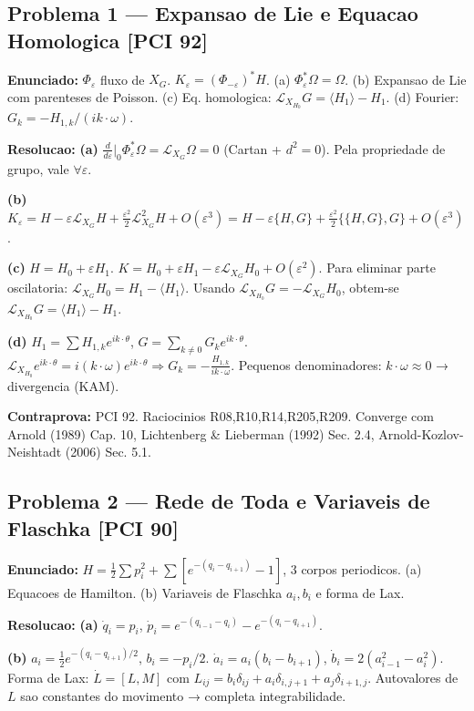 \documentclass[12pt,a4paper,oneside]{article}
\begin{document}
\subsection{Problema 1 — Expansao de Lie e Equacao Homologica [PCI 92]}
\textbf{Enunciado:} $\Phi_\varepsilon$ fluxo de $X_G$. $K_\varepsilon=(\Phi_{-\varepsilon})^*H$.
(a) $\Phi_\varepsilon^*\Omega=\Omega$. (b) Expansao de Lie com parenteses de Poisson.
(c) Eq. homologica: $\mathcal{L}_{X_{H_0}}G=\langle H_1\rangle-H_1$.
(d) Fourier: $G_k=-H_{1,k}/(ik\cdot\omega)$.

\textbf{Resolucao:}
\textbf{(a)} $\frac{d}{d\varepsilon}|_0\Phi_\varepsilon^*\Omega=\mathcal{L}_{X_G}\Omega=0$ (Cartan + $d^2=0$). Pela propriedade de grupo, vale $\forall\varepsilon$.

\textbf{(b)} $K_\varepsilon=H-\varepsilon\mathcal{L}_{X_G}H+\frac{\varepsilon^2}{2}\mathcal{L}^2_{X_G}H+O(\varepsilon^3)
=H-\varepsilon\{H,G\}+\frac{\varepsilon^2}{2}\{\{H,G\},G\}+O(\varepsilon^3)$.

\textbf{(c)} $H=H_0+\varepsilon H_1$. $K=H_0+\varepsilon H_1-\varepsilon\mathcal{L}_{X_G}H_0+O(\varepsilon^2)$.
Para eliminar parte oscilatoria: $\mathcal{L}_{X_G}H_0=H_1-\langle H_1\rangle$. Usando $\mathcal{L}_{X_{H_0}}G=-\mathcal{L}_{X_G}H_0$, obtem-se $\mathcal{L}_{X_{H_0}}G=\langle H_1\rangle-H_1$.

\textbf{(d)} $H_1=\sum H_{1,k}e^{ik\cdot\theta}$, $G=\sum_{k\neq0}G_ke^{ik\cdot\theta}$.
$\mathcal{L}_{X_{H_0}}e^{ik\cdot\theta}=i(k\cdot\omega)e^{ik\cdot\theta}\Rightarrow G_k=-\frac{H_{1,k}}{ik\cdot\omega}$.
Pequenos denominadores: $k\cdot\omega\approx0$ → divergencia (KAM).

\textbf{Contraprova:} PCI 92. Raciocinios R08,R10,R14,R205,R209. Converge com Arnold (1989) Cap. 10, Lichtenberg \& Lieberman (1992) Sec. 2.4, Arnold-Kozlov-Neishtadt (2006) Sec. 5.1.

\subsection{Problema 2 — Rede de Toda e Variaveis de Flaschka [PCI 90]}
\textbf{Enunciado:} $H=\frac12\sum p_i^2+\sum[e^{-(q_i-q_{i+1})}-1]$, 3 corpos periodicos.
(a) Equacoes de Hamilton. (b) Variaveis de Flaschka $a_i,b_i$ e forma de Lax.

\textbf{Resolucao:}
\textbf{(a)} $\dot{q}_i=p_i$, $\dot{p}_i=e^{-(q_{i-1}-q_i)}-e^{-(q_i-q_{i+1})}$.

\textbf{(b)} $a_i=\frac12 e^{-(q_i-q_{i+1})/2}$, $b_i=-p_i/2$.
$\dot{a}_i=a_i(b_i-b_{i+1})$, $\dot{b}_i=2(a_{i-1}^2-a_i^2)$.
Forma de Lax: $\dot{L}=[L,M]$ com $L_{ij}=b_i\delta_{ij}+a_i\delta_{i,j+1}+a_j\delta_{i+1,j}$.
Autovalores de $L$ sao constantes do movimento → completa integrabilidade.
\end{document}
